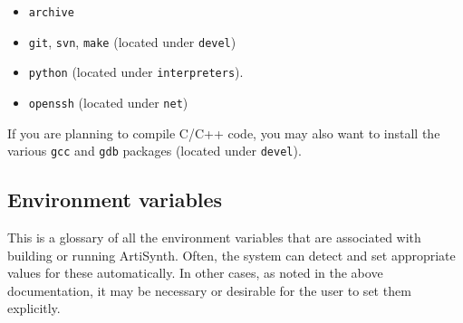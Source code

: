 \begin{itemize}

\item {\tt archive}
\item {\tt git}, {\tt svn}, {\tt make} (located under {\tt devel})
\item {\tt python} (located under {\tt interpreters}).
\item {\tt openssh} (located under {\tt net})

\end{itemize}

If you are planning to compile C/C++ code, you may also want to
install the various {\tt gcc} and {\tt gdb} packages (located under {\tt devel}).
\fi %

\subsection{Environment variables}
\label{EnvironmentVariables}

This is a glossary of all the environment variables that are
associated with building or running ArtiSynth. Often, the system can
detect and set appropriate values for these automatically. In other
cases, as noted in the above documentation, it may be necessary or
desirable for the user to set them explicitly.

